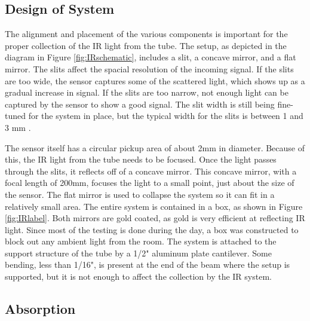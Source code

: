 \subsection{Design of System}
The alignment and placement of the various components is important for the proper collection of the IR light from the tube. The setup, as depicted in the diagram in Figure \ref{fig:IRschematic}, includes a slit, a concave mirror, and a flat mirror. The slits affect the spacial resolution of the incoming signal. If the slits are too wide, the sensor captures some of the scattered light, which shows up as a gradual increase in signal. If the slits are too narrow, not enough light can be captured by the sensor to show a good signal. The slit width is still being fine-tuned for the system in place, but the typical width for the slits is between 1 and 3 mm \cite{flower1976experimental}. 

The sensor itself has a circular pickup area of about 2mm in diameter. Because of this, the IR light from the tube needs to be focused. Once the light passes through the slits, it reflects off of a concave mirror. This concave mirror, with a focal length of 200mm, focuses the light to a small point, just about the size of the sensor. The flat mirror is used to collapse the system so it can fit in a relatively small area. The entire system is contained in a box, as shown in Figure \ref{fig:IRlabel}. Both mirrors are gold coated, as gold is very efficient at reflecting IR light. Since most of the testing is done during the day, a box was constructed to block out any ambient light from the room. The system is attached to the support structure of the tube by a 1/2" aluminum plate cantilever. Some bending, less than 1/16",  is present at the end of the beam where the setup is supported, but it is not enough to affect the collection by the IR system. 


\subsection{Absorption}

